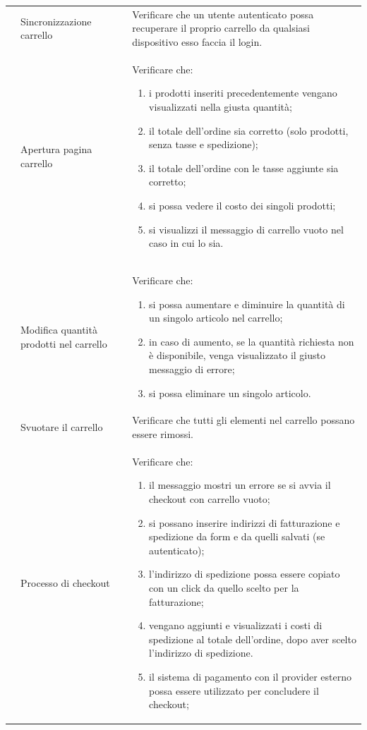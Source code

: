 \begin{center}
\begin{longtable}{|p{1cm}|p{4.85cm}|p{9cm}|}
	 & Sincronizzazione carrello & Verificare che un utente autenticato possa recuperare il proprio carrello da qualsiasi dispositivo esso faccia il login.\\

	 & Apertura pagina carrello & Verificare che: 
	\begin{enumerate}
		\item i prodotti inseriti precedentemente vengano visualizzati nella giusta quantità;
		\item il totale dell'ordine sia corretto (solo prodotti, senza tasse e spedizione);
		\item il totale dell'ordine con le tasse aggiunte sia corretto;
		\item si possa vedere il costo dei singoli prodotti;
		\item si visualizzi il messaggio di carrello vuoto nel caso in cui lo sia.
	\end{enumerate} \\
	 & Modifica quantità prodotti nel carrello & Verificare che:
	\begin{enumerate}
		\item si possa aumentare e diminuire la quantità di un singolo articolo nel carrello;
		\item in caso di aumento, se la quantità richiesta non è disponibile, venga visualizzato il giusto messaggio di errore;
		\item si possa eliminare un singolo articolo.
	\end{enumerate}\\
	 & Svuotare il carrello & Verificare che tutti gli elementi nel carrello possano essere rimossi. \\
	 & Processo di checkout & Verificare che:
	\begin{enumerate}
		\item il messaggio mostri un errore se si avvia il checkout con carrello vuoto;
		\item si possano inserire indirizzi di fatturazione e spedizione da form e da quelli salvati (se autenticato);
		\item l'indirizzo di spedizione possa essere copiato con un click da quello scelto per la fatturazione;
		\item vengano aggiunti e visualizzati i costi di spedizione al totale dell'ordine, dopo aver scelto l'indirizzo di spedizione. 
		\item il sistema di pagamento con il provider esterno possa essere utilizzato per concludere il checkout;

\end{enumerate}
\end{longtable}
\end{center}
